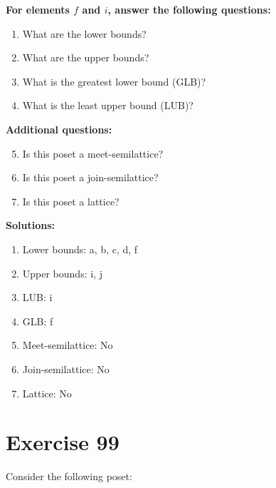 \documentclass{article}
\begin{document}
    \textbf{For elements $f$ and $i$, answer the following questions:}
\begin{enumerate}
    \item What are the lower bounds?
    \item What are the upper bounds?
    \item What is the greatest lower bound (GLB)?
    \item What is the least upper bound (LUB)?
\end{enumerate}
    \hspace*{3ex} \textbf{Additional questions:}
\begin{enumerate}
    \setcounter{enumi}{4}
    \item Is this poset a meet-semilattice?
    \item Is this poset a join-semilattice?
    \item Is this poset a lattice?
\end{enumerate}

\textbf{Solutions:}
\begin{enumerate}
    \item Lower bounds: {a, b, c, d, f}
    \item Upper bounds: {i, j}
    \item LUB: i
    \item GLB: f
    \item Meet-semilattice: No
    \item Join-semilattice: No
    \item Lattice: No
\end{enumerate}
\newpage
\section*{Exercise 99}
Consider the following poset:
\begin{center}
\end{center}
\end{document}
